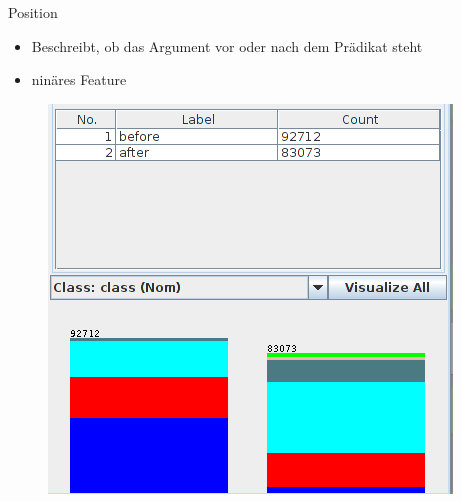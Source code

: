 \documentclass[10pt]{beamer}
\begin{document}
  \begin{frame}{Position}
   \begin{itemize}
    \item Beschreibt, ob das Argument vor oder nach dem Prädikat steht
    \item ninäres Feature
   \end{itemize}
   
   \begin{figure}
   	\begin{center}
   		\includegraphics[scale=0.3]{position}
   	\end{center}
   \end{figure}
  \end{frame}
  
\end{document}
